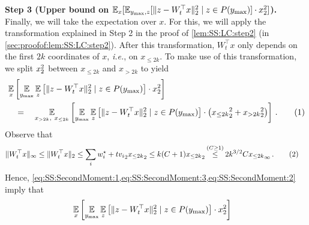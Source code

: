 \documentclass[11pt,letterpaper]{article}
\theoremstyle{plain}
\theoremstyle{definition}
\theoremstyle{remark}
\newcommand{\yesnum}{\addtocounter{equation}{1}\tag{\theequation}}
\newcommand{\Stackrel}[2]{\stackrel{\mathmakebox[\widthof{\ensuremath{#2}}]{#1}}{#2}}
\newcommand{\inparen}[1]{\ensuremath{\left(#1\right)}}
\newcommand{\insquare}[1]{\ensuremath{\left[#1\right]}}
\newcommand{\snorm}[1]{\ensuremath{\ensuremath{\| #1 \|}}}
\let\norm\relax
\newcommand{\norm}[1]{\ensuremath{\left\lVert #1 \right\rVert}}
\newcommand{\E}{\operatornamewithlimits{\mathbb{E}}}
\newcommand{\Ex}{\E}
\renewcommand{\paragraph}[1]{\medskip \noindent\textbf{#1}~}
\newcommand{\ie}{\emph{i.e.}}
\newcommand{\ymax}{y_{\max}}
\begin{document}
{{        \paragraph{Step 3 (Upper bound on $\Ex_{x}[\Ex_{\ymax,z}[\snorm{z - W_t^\top x}_2^2 \mid z\in P(\ymax)]\cdot \norm{x}_2^2]$).}
            Finally, we will take the expectation over $x$.
            For this, we will apply the transformation explained in Step 2 in the proof of \cref{lem:SS:LC:step2} (in \cref{sec:proofof:lem:SS:LC:step2}).
            After this transformation, $W_t^\top x$ only depends on the first $2k$ coordinates of $x$, \ie{}, on $x_{\leq 2k}$.
            To make use of this transformation, we split $\norm{x}_2^2$ between $x_{\leq 2k}$ and $x_{> 2k}$ to yield
            \begin{align*}
                &\Ex_{x}\insquare{
                \Ex_{\ymax}
                \Ex_z\insquare{
                    \snorm{z - W_t^\top x}_2^2  \mid z\in P(\ymax)
                }
                \cdot 
                \norm{x}_2^2 
                }\\
                &\quad=\quad
                \Ex_{x_{>2k},~x_{\leq 2k}}\insquare{
                    \Ex_{\ymax}
                    \Ex_z\insquare{
                        \snorm{z - W_t^\top x}_2^2  \mid z\in P(\ymax)
                    }
                    \cdot 
                    \inparen{
                        \norm{x_{\leq 2k}}_2^2 
                        + 
                        \norm{x_{> 2k}}_2^2 
                    }
                }\,.
                \yesnum\label{eq:SS:SecondMoment:3}
            \end{align*}
            Observe that
            \begin{align*}
                \snorm{W_t^\top x}_\infty 
                \leq \snorm{W_t^\top x}_2
                &\leq \sum_i \norm{w^\star_i + t v_i}_2 \norm{x_{\leq 2k}}_2
                \leq 
                k(C+1)\norm{x_{\leq 2k}}_2
                ~~\Stackrel{(C\geq 1)}{\leq}~~ 2k^{3/2}C \norm{x_{\leq 2k}}_\infty \,.
                \yesnum\label{eq:SS:SecondMoment:2}
            \end{align*}
            Hence, \cref{eq:SS:SecondMoment:1,eq:SS:SecondMoment:3,eq:SS:SecondMoment:2} imply that 
            \begin{align*}
                &\Ex_{x}\insquare{
                \Ex_{\ymax}
                \Ex_z\insquare{
                    \snorm{z - W_t^\top x}_2^2  \mid z\in P(\ymax)
                }
                \cdot 
                \norm{x}_2^2 
}
\end{align*}}}
\end{document}
